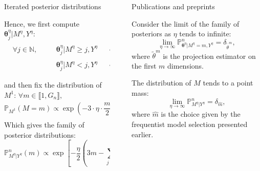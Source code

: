 \documentclass[final,hyperref={pdfpagelabels=false}]{beamer}
\begin{document}
\begin{frame}[t]
\begin{columns}[t]
\begin{column}{.30\textwidth}
\begin{block}{\rule{0pt}{2.5ex} Iterated posterior distributions}
Hence, we first compute $\boldsymbol{\theta}^{\eta}_{j} \vert M^{\eta}, Y^{\eta}$:
\textcolor{red!90!black}{\begin{alignat*}{4}
& \forall j \in \mathbb{N}, && \quad \boldsymbol{\theta}^{\eta}_{j} \vert M^{\eta} \geq j, Y^{\eta} &&\sim &&\mathcal{N}\left(\frac{\eta \cdot Y_{j} \cdot n \cdot \lambda_{j}}{1 + \eta \cdot n \cdot \lambda_{j}^{2}}, \frac{1}{1 + n \cdot \eta \cdot \lambda_{j}^{2}} \right),\\
&  && \quad \boldsymbol{\theta}^{\eta}_{j} \vert M^{\eta} < j, Y^{\eta} &&\sim &&\delta_{0};
\end{alignat*}}

and then fix the distribution of $M^{1}$: $\forall m \in \llbracket 1, G_{n} \rrbracket, $
\[\mathbb{P}_{M^{1}}(M = m) \propto \exp\left(-3 \cdot \eta \cdot \frac{m}{2} \right) \cdot \prod\limits_{j = 1}^{m} \left(1 + n \cdot \eta \cdot \lambda_{j}^{2}\right)^{2}.\]
Which gives the family of posterior distributions:
\textcolor{red!90!black}{\[\mathbb{P}_{M^{\eta} \vert Y^{\eta}}^{n}(m) \propto \exp\!\!\left[- \frac{\eta}{2} \left( 3 m - \sum\limits_{j = 1}^{m} \frac{\eta\left(Y_{j} \cdot n \cdot \lambda_{j}^{2}\right)^{2}}{1 + \eta \cdot n \cdot \lambda_{j}^{2}} \right)\right].\]}

\end{block}

\end{column} %

\begin{column}{.02\textwidth}\end{column} %
 
\begin{column}{.30\textwidth} %


\begin{block}{\rule{0pt}{2.5ex} Publications and preprints}
Consider the limit of the family of posteriors as $\eta$ tends to infinite:
\[\lim_{\eta \rightarrow \infty} \mathbb{P}_{\boldsymbol{\theta}^{\eta} \vert M^{\eta} = m, Y^{\eta}}^{n} = \delta_{\tilde{\theta}^{m}},\]
where $\tilde{\theta}^{m}$ is the projection estimator on the first $m$ dimensions.

The distribution of $M$ tends to a point mass:
\[\lim_{\eta \rightarrow \infty} \mathbb{P}_{M^{\eta}\vert Y^{\eta}}^{n} = \delta_{\widehat{m}},\]
where $\widehat{m}$ is the choice given by the frequentist model selection presented earlier.


\end{block}
\end{column}
\end{columns}
\end{frame}
\end{document}
